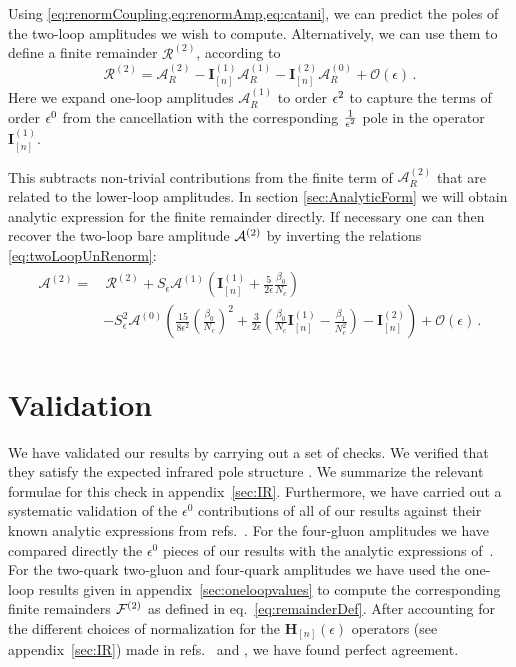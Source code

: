 Using \cref{eq:renormCoupling,eq:renormAmp,eq:catani}, we can predict
the poles of the two-loop amplitudes we wish to compute. Alternatively, we
can use them to define a finite remainder $\mathcal{R}^{(2)}$, according to
\begin{equation}\label{eq:remaindeDef}
  \mathcal{R}^{(2)}=\mathcal{A}_R^{(2)}
  -\mathbf{I}_{[n]}^{(1)}\mathcal{A}_R^{(1)}
  -\mathbf{I}_{[n]}^{(2)}\mathcal{A}_R^{(0)}
  +\mathcal{O}(\epsilon)\,.
\end{equation}
Here we expand one-loop amplitudes $\mathcal{A}_R^{(1)}$ to order $\epsilon^2$ to capture the terms of order $\epsilon^0$
from the cancellation with the corresponding $\frac{1}{\epsilon^2}$ pole in the operator $\mathbf{I}_{[n]}^{(1)}$.

This subtracts non-trivial contributions from
the finite term of $\mathcal{A}_R^{(2)}$ that are related to 
the lower-loop amplitudes.
In section \ref{sec:AnalyticForm} we will obtain analytic expression for the finite remainder directly.
If necessary one can then recover the two-loop bare amplitude $\mathcal{A}^{(2)}$ by inverting
the relations \eqref{eq:twoLoopUnRenorm}:
\begin{align}
  \begin{split}
    \label{eq:ampFromRem}
    {\mathcal{A}}^{(2)}=&\,\mathcal{R}^{(2)}+
    S_\epsilon{\mathcal{A}}^{(1)}
    \left(\mathbf{I}_{[n]}^{(1)}+\frac{5}{2\epsilon}
    \frac{\beta_0}
    {N_c}\right)\\
    &-S_\epsilon^2 {\mathcal{A}}^{(0)}
    \left(
    \frac{15}{8\epsilon^2}
    \left(\frac{\beta_0}{N_c}\right)^2+\frac{3}{2\epsilon}
    \left(\frac{\beta_0}{N_c}\mathbf{I}_{[n]}^{(1)}-
    \frac{\beta_1}{N_c^2}\right)-\mathbf{I}_{[n]}^{(2)}
    \right)+\mathcal{O}(\epsilon)\,.
  \end{split}
\end{align}


\section{Validation}
We have validated our results by carrying out a set of
checks. We verified that they satisfy the
expected infrared pole structure \cite{Catani:1998bh}. We summarize the
relevant formulae for this check in appendix~\ref{sec:IR}.
Furthermore, we have carried out a systematic
validation of the $\epsilon^0$ contributions of all of 
our results against their known analytic
expressions from refs.~\cite{Bern:2002tk,Bern:2003ck,
DeFreitas:2004kmi,Glover:2004si}. 
For the four-gluon amplitudes we have compared directly the
$\epsilon^0$ pieces of our results with the analytic expressions
of~\cite{Bern:2002tk}. For the
two-quark two-gluon and four-quark amplitudes we have used the
one-loop results given in appendix~\ref{sec:oneloopvalues}
to compute the corresponding finite remainders $\mathcal{F}^{(2)}$ as
defined in eq.~\eqref{eq:remainderDef}. 
After accounting for the different choices of 
normalization for the $\mathbf{H}_{[n]}(\epsilon)$ operators 
(see appendix~\ref{sec:IR})
made in refs.~\cite{Bern:2003ck} and \cite{Glover:2004si},
we have found perfect agreement.


